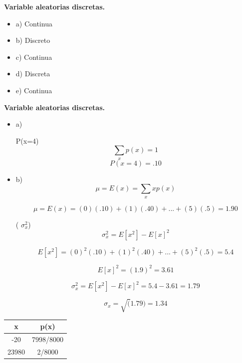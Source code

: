 \documentclass{oxmathproblems}
\begin{document}
\begin{questions}

\question\textbf {Variable aleatorias discretas.}

\begin{itemize}
\item  a) Continua 
\item  b) Discreto 
\item  c) Continua 
\item  d) Discreta 
\item  e) Continua 
\end{itemize}

\question\textbf {Variable aleatorias discretas.}

\begin{itemize}
\item  a) 

 P(x=4) 
        $$ \sum_x p(x)= 1 $$ 
$$ P(x=4) = .10$$

\item  b) 
$$ \mu = E(x)= \sum_x xp(x)$$


$$ \mu = E(x)= (0)(.10)+ (1)(.40)+ ... +(5)(.5) = 1.90 $$

  ( $\sigma^2_x$) 
  $$ \sigma^2_x = E[x^2]-E[x]^2 $$
  
$$ E[x^2] = (0)^2(.10)+ (1)^2(.40)+ ... +(5)^2(.5)= 5.4 $$ 

$$ E[x]^2 = (1.9)^2 = 3.61  $$

 $$ \sigma^2_x = E[x^2]-E[x]^2 = 5.4 - 3.61 = 1.79 $$


$$ \sigma_x = \sqrt(1.79) = 1.34 $$ 
\end{itemize}

\question 
{}  


 \begin{center}
\begin{tabular}{ |c|c| } 
 \hline
 \textbf{x} & \textbf{p(x)} \\ 
 \hline
 -20 & 7998/8000 \\
 23980  & 2/8000 \\
 \hline
\end{tabular}
\end{center} 


\end{questions}
\end{document}
